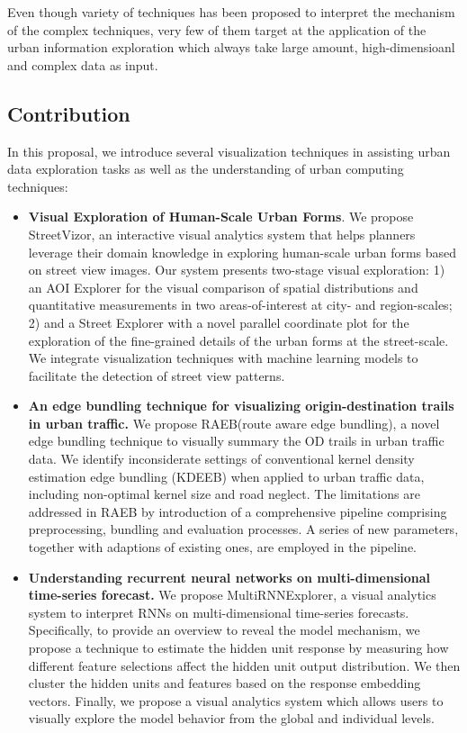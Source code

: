Even though variety of techniques has been proposed to interpret the mechanism of the complex techniques, very few of them target at the application of the urban information exploration which always take large amount, high-dimensioanl and complex data as input.  

\subsection{Contribution}
In this proposal, we introduce several visualization techniques in assisting urban data exploration tasks as well as the understanding of urban computing techniques:

\begin{itemize}[noitemsep]
	\item \textbf{Visual Exploration of Human-Scale Urban Forms}. We propose StreetVizor, an interactive visual analytics system that helps planners leverage their domain knowledge in exploring human-scale urban forms based on street view images. Our system presents two-stage visual exploration: 1) an AOI Explorer for the visual comparison of spatial distributions and quantitative measurements in two areas-of-interest at city- and region-scales; 2) and a Street Explorer with a novel parallel coordinate plot for the exploration of the fine-grained details of the urban forms at the street-scale. We integrate visualization techniques with machine learning models to facilitate the detection of street view patterns. 
	\item \textbf{An edge bundling technique for visualizing origin-destination trails in urban traffic.} We propose RAEB(route aware edge bundling), a novel edge bundling technique to visually summary the OD trails in urban traffic data. We identify inconsiderate settings of conventional kernel density estimation edge bundling (KDEEB) when applied to urban traffic data, including non-optimal kernel size and road neglect. The limitations are addressed in RAEB by introduction of a comprehensive pipeline comprising preprocessing, bundling and evaluation processes. A series of new parameters, together with adaptions of existing ones, are employed in the pipeline. 
	\item \textbf{Understanding recurrent neural networks on multi-dimensional time-series forecast.} We propose MultiRNNExplorer, a visual analytics system to interpret RNNs on multi-dimensional time-series forecasts.  
	Specifically, to provide an overview to reveal the model mechanism, we propose a technique to estimate the hidden unit response by measuring how different feature selections affect the hidden unit output distribution. 
	We then cluster the hidden units and features based on the response embedding vectors. 
	Finally, we propose a visual analytics system which allows users to visually explore the model behavior from the global and individual levels.
\end{itemize}



